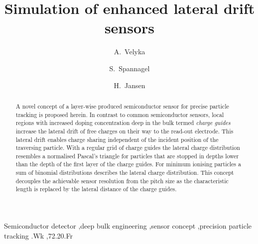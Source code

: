 \documentclass[preprint]{elsarticle}
\begin{document}
\begin{frontmatter}


\title{Simulation of enhanced lateral drift sensors}

\author[desy]{A.~Velyka}

\author[cern]{S.~Spannagel}

\address[cern]{Route de , Geneva, Switzerland}

\author[desy]{H.~Jansen}

\address[desy]{Notkestr. 85, 22607 Hamburg, Germany}

\begin{abstract}
A novel concept of a layer-wise produced semiconductor sensor for precise particle tracking is proposed herein. 
In contrast to common semiconductor sensors, local regions with increased doping concentration deep in the bulk termed \textit {charge guides}
 increase the lateral drift of free charges on their way to the read-out electrode. 
This lateral drift enables charge sharing independent of the incident position of the traversing particle. 
With a regular grid of charge guides the lateral charge distribution resembles a normalised Pascal's triangle for particles that are stopped in depths lower than the depth of the first layer of the charge guides. 
For minimum ionising particles a sum of binomial distributions describes the lateral charge distribution. 
This concept decouples the achievable sensor resolution from the pitch size as the characteristic length is replaced by the lateral distance of the charge guides. 
\end{abstract}

\begin{keyword}
Semiconductor detector \sep deep bulk engineering \sep sensor concept \sep precision particle tracking
.Wk \sep 72.20.Fr
\end{keyword}

\end{frontmatter}

\linenumbers
\end{document}

